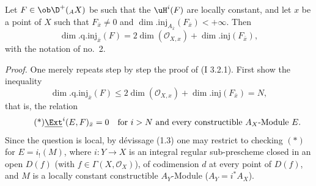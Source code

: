Let $F\in\ob\D^+({}_A X)$ be such that the $\uH^i(F)$ are locally constant, and let $x$ be a point of $X$ such that $F_{\bar{x}}\neq0$ and $\dim.\mathrm{inj}_{A_{\bar{x}}}(F_{\bar{x}})<+\infty$. Then
\[
        \dim.\mathrm{q.inj}_{\bar{x}}(F)=2\dim(\mathcal{O}_{X,x})+\dim.\mathrm{inj}(F_{\bar{x}}),
\]
with the notation of no.~2.

\emph{Proof.} One merely repeats step by step the proof of (I 3.2.1). First show the inequality
\[
        \dim.\mathrm{q.inj}_{\bar{x}}(F)\leq 2\dim(\mathcal{O}_{X,x})+\dim.\mathrm{inj}(F_{\bar{x}})=N,
\]
that is, the relation
\begin{equation}\tag{*}
        \underline{\Ext}^{i}(E,F)_{\bar{x}}=0\quad\text{for } i>N\text{ and every constructible }A_X\text{-Module }E.
\end{equation}
Since the question is local, by dévissage (1.3) one may restrict to checking $(*)$ for $E=i_!(M)$, where $i:Y\to X$ is an integral regular sub-prescheme closed in an open $D(f)$ (with $f\in\Gamma(X,\mathcal{O}_X)$), of codimension $d$ at every point of $D(f)$, and $M$ is a locally constant constructible $A_Y$-Module ($A_Y=i^*A_X$).

